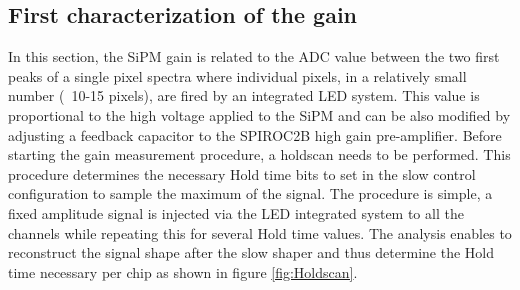 \begin{table}[htb!]
  \centering
  \caption{List of breakdown and operating voltages applied to each SiPM types. $V_{op}$ represents $V_{Br} + V_{overvoltage}$.}
  \label{table:Voltage_SiPM}
\end{table}

\subsection{First characterization of the gain}

In this section, the SiPM gain is related to the ADC value between the two first peaks of a single pixel spectra where individual pixels, in a relatively small number (~10-15 pixels), are fired by an integrated LED system. This value is proportional to the high voltage applied to the SiPM and can be also modified by adjusting a feedback capacitor to the SPIROC2B high gain pre-amplifier. Before starting the gain measurement procedure, a holdscan needs to be performed. This procedure determines the necessary Hold time bits to set in the slow control configuration to sample the maximum of the signal. The procedure is simple, a fixed amplitude signal is injected via the LED integrated system to all the channels while repeating this for several Hold time values. The analysis enables to reconstruct the signal shape after the slow shaper and thus determine the Hold time necessary per chip as shown in figure \ref{fig:Holdscan}.

